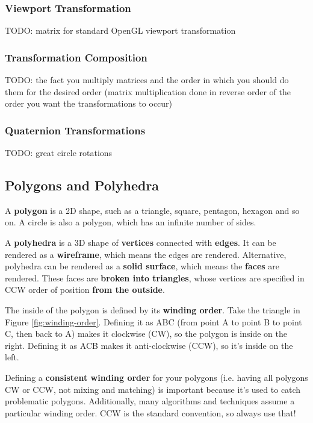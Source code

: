 \documentclass{article}
\begin{document}
\subsubsection{Viewport Transformation}

TODO: matrix for standard OpenGL viewport transformation

\subsubsection{Transformation Composition}

TODO: the fact you multiply matrices and the order in which you should do them for the desired order (matrix multiplication done in reverse order of the order you want the transformations to occur)

\subsubsection{Quaternion Transformations}

TODO: great circle rotations

\subsection{Polygons and Polyhedra}

A \textbf{polygon} is a 2D shape, such as a triangle, square, pentagon, hexagon and so on. A circle is also a polygon, which has an infinite number of sides.

A \textbf{polyhedra} is a 3D shape of \textbf{vertices} connected with \textbf{edges}. It can be rendered as a \textbf{wireframe}, which means the edges are rendered. Alternative, polyhedra can be rendered as a \textbf{solid surface}, which means the \textbf{faces} are rendered. These faces are \textbf{broken into triangles}, whose vertices are specified in CCW order of position \textbf{from the outside}.

The inside of the polygon is defined by its \textbf{winding order}. Take the triangle in Figure \ref{fig:winding-order}. Defining it as ABC (from point A to point B to point C, then back to A) makes it clockwise (CW), so the polygon is inside on the right. Defining it as ACB makes it anti-clockwise (CCW), so it's inside on the left.

Defining a \textbf{consistent winding order} for your polygons (i.e. having all polygons CW or CCW, not mixing and matching) is important because it's used to catch problematic polygons. Additionally, many algorithms and techniques assume a particular winding order. CCW is the standard convention, so always use that!
\end{document}
